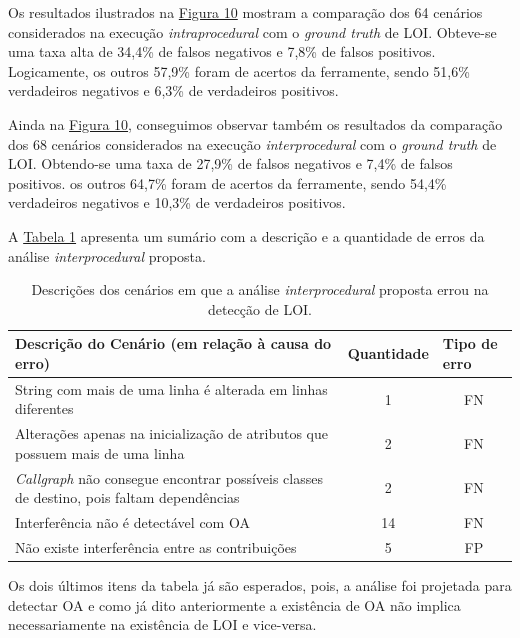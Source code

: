 Os resultados ilustrados na \hyperref[fig:loi-x-groundtruthloi]{Figura 10} mostram a comparação dos 64 cenários considerados na execução \emph{intraprocedural} com o \emph{ground truth} de LOI. Obteve-se uma taxa alta de 34,4\% de falsos negativos e 7,8\% de falsos positivos. Logicamente, os outros 57,9\% foram de acertos da ferramente, sendo 51,6\% verdadeiros negativos e 6,3\% de verdadeiros positivos. 

Ainda na \hyperref[fig:loi-x-groundtruthloi]{Figura 10}, conseguimos observar também os resultados da comparação dos 68 cenários considerados na execução \emph{interprocedural} com o \emph{ground truth} de LOI. Obtendo-se uma taxa de 27,9\% de falsos negativos e 7,4\% de falsos positivos. os outros 64,7\% foram de acertos da ferramente, sendo 54,4\% verdadeiros negativos e 10,3\% de verdadeiros positivos.

A \hyperref[tab:erros-inter-loi]{Tabela 1} apresenta um sumário com a descrição e a quantidade de erros da análise \emph{interprocedural} proposta.

\begin{table}[h]
    \centering
    \begin{tabularx}{\linewidth}{X c c}
        \hline
        Descrição do Cenário (em relação à causa do erro) & \multicolumn{1}{l}{Quantidade} & \multicolumn{1}{l}{Tipo de erro} \\ \hline
        String com mais de uma linha é alterada em linhas diferentes & 1 & FN \\ \hline
        Alterações apenas na inicialização de atributos que possuem mais de uma linha & 2 & FN \\ \hline
        \emph{Callgraph} não consegue encontrar possíveis classes de destino, pois faltam dependências & 2  & FN \\ \hline
        Interferência não é detectável com OA & 14 & FN \\ \hline
        Não existe interferência entre as contribuições & 5  & FP\\ \hline
    \end{tabularx}
    \caption{Descrições dos cenários em que a análise \emph{interprocedural} proposta errou na detecção de LOI.}
    \label{tab:erros-inter-loi}
\end{table}

Os dois últimos itens da tabela já são esperados, pois, a análise foi projetada para detectar OA e como já dito anteriormente a existência de OA não implica necessariamente na existência de LOI e vice-versa.

